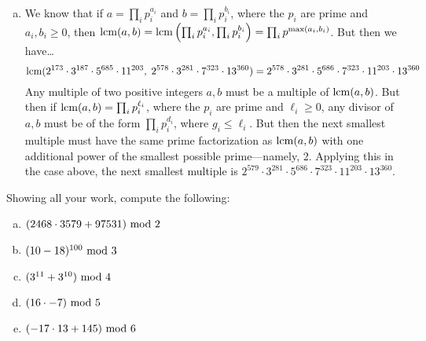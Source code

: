 \documentclass[12pt,letterpaper]{exam}
\begin{document}
\begin{questions}
{\begin{enumerate}[(a)]
\item We know that if $a= \prod_i p_i^{a_i}$ and $b= \prod_i p_i^{b_i}$, where the $p_i$ are prime and $a_i, b_i \geq 0$, then $\operatorname{lcm}(a, b)= \operatorname{lcm} \left( \prod_i p_i^{a_i}, \prod_i p_i^{b_i} \right)= \prod_i p^{\max(a_i, b_i)}$. But then we have\dots
	\[
	\operatorname{lcm}(2^{173} \cdot 3^{187} \cdot 5^{685} \cdot 11^{203}, \; 2^{578} \cdot 3^{281} \cdot 7^{323} \cdot 13^{360})= 2^{578} \cdot 3^{281} \cdot 5^{686} \cdot 7^{323} \cdot 11^{203} \cdot 13^{360}
	\]
Any multiple of two positive integers $a, b$ must be a multiple of $\operatorname{lcm}(a, b)$. But then if $\operatorname{lcm}(a, b)= \prod_i p_i^{\ell_i}$, where the $p_i$ are prime and $\ell_i \geq 0$, any divisor of $a, b$ must be of the form $\prod_i p_i^{d_i}$, where $g_i \leq \ell_i$. But then the next smallest multiple must have the same prime factorization as $\operatorname{lcm}(a, b)$ with one additional power of the smallest possible prime---namely, 2. Applying this in the case above, the next smallest multiple is $2^{579} \cdot 3^{281} \cdot 5^{686} \cdot 7^{323} \cdot 11^{203} \cdot 13^{360}$.
\end{enumerate}
}



\newpage
\question[10] Showing all your work, compute the following:
	\begin{enumerate}[(a)]
	\item $(2468 \cdot 3579 + 97531) \text{ mod } 2$
	\item $(10 - 18)^{100} \text{ mod } 3$
	\item $(3^{11} + 3^{10}) \text{ mod } 4$
	\item $(16 \cdot -7) \text{ mod } 5$
	\item $(-17 \cdot 13 + 145) \text{ mod } 6$
	\end{enumerate} \pspace

\end{questions}
\end{document}
